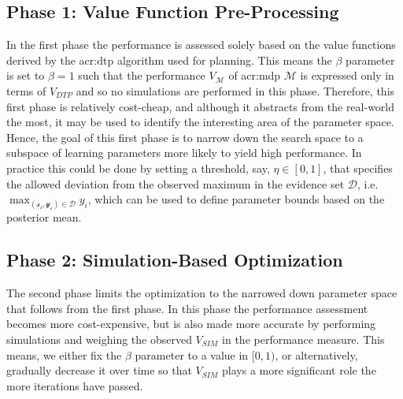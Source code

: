 \subsection{Phase 1: Value Function Pre-Processing}
\label{sec:phase-1}

In the first phase the performance is assessed solely based on the value functions derived by the \acrshort{acr:dtp} algorithm used for planning.
This means the $\beta$ parameter is set to $\beta = 1$ such that the performance $V_{\mathcal{M}}$ of \acrshort{acr:mdp} $\mathcal{M}$ is expressed only in terms of $V_\mathit{DTP}$ and so no simulations are performed in this phase.
Therefore, this first phase is relatively cost-cheap, and although it abstracts from the real-world the most, it may be used to identify the interesting area of the parameter space.
Hence, the goal of this first phase is to narrow down the search space to a subspace of learning parameters more likely to yield high performance.
In practice this could be done by setting a threshold, say, $\eta \in [0, 1]$, that specifies the allowed deviation from the observed maximum in the evidence set $\mathcal{D}$, i.e. $\max_\mathcal{(x_i, y_i) \in D} y_i$, which can be used to define parameter bounds based on the posterior mean.



\subsection{Phase 2: Simulation-Based Optimization}
\label{sec:phase-2}

The second phase limits the optimization to the narrowed down parameter space that follows from the first phase.
In this phase the performance assessment becomes more cost-expensive, but is also made more accurate by performing simulations and weighing the observed $V_\mathit{SIM}$ in the performance measure.
This means, we either fix the $\beta$ parameter to a value in $[0, 1)$, or alternatively, gradually decrease it over time so that $V_\mathit{SIM}$ plays a more significant role the more iterations have passed.


